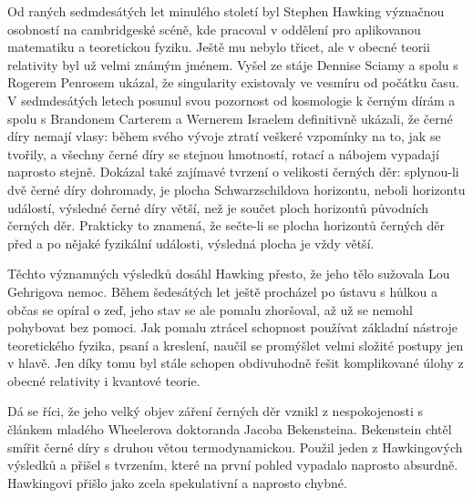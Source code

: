   Od raných sedmdesátých let minulého století byl Stephen Hawking význačnou osobností na
  cambridgeské scéně, kde pracoval v oddělení pro aplikovanou matematiku a teoretickou fyziku. Ještě
  mu nebylo třicet, ale v obecné teorii relativity byl už velmi známým jménem. Vyšel ze stáje
  Dennise Sciamy a spolu s Rogerem Penrosem ukázal, že singularity existovaly ve vesmíru od počátku
  času. V sedmdesátých letech posunul svou pozornost od kosmologie k černým dírám a spolu s
  Brandonem Carterem a Wernerem Israelem definitivně ukázali, že černé díry nemají vlasy: během
  svého vývoje ztratí veškeré vzpomínky na to, jak se tvořily, a všechny černé díry se stejnou
  hmotností, rotací a nábojem vypadají naprosto stejně. Dokázal také zajímavé tvrzení o velikosti
  černých děr: splynou-li dvě černé díry dohromady, je plocha Schwarzschildova horizontu, neboli
  horizontu událostí, výsledné černé díry větší, než je součet ploch horizontů původních černých
  děr. Prakticky to znamená, že sečte-li se plocha horizontů černých děr před a po nějaké fyzikální
  události, výsledná plocha je vždy větší. 
  
  Těchto významných výsledků dosáhl Hawking přesto, že jeho tělo sužovala Lou Gehrigova nemoc. Během
  šedesátých let ještě procházel po ústavu s hůlkou a občas se opíral o zeď, jeho stav se ale pomalu
  zhoršoval, až už se nemohl pohybovat bez pomoci. Jak pomalu ztrácel schopnost používat základní
  nástroje teoretického fyzika, psaní a kreslení, naučil se promýšlet velmi složité postupy jen v
  hlavě. Jen díky tomu byl stále schopen obdivuhodně řešit komplikované úlohy z obecné relativity i
  kvantové teorie. 
  
  Dá se říci, že jeho velký objev záření černých děr vznikl z nespokojenosti s článkem mladého
  Wheelerova doktoranda Jacoba Bekensteina. Bekenstein chtěl smířit černé díry s druhou větou
  termodynamickou. Použil jeden z Hawkingových výsledků a přišel s tvrzením, které na první pohled
  vypadalo naprosto absurdně. Hawkingovi přišlo jako zcela spekulativní a naprosto chybné. 
  
